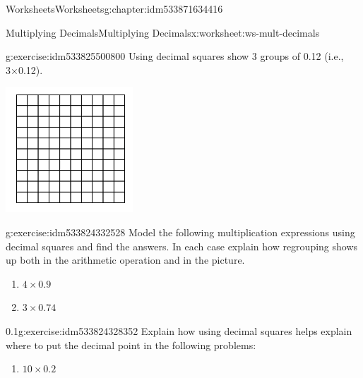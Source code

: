 \documentclass[twoside,11pt,]{book}
\begin{document}
\begin{chapterptx}{Worksheets}{}{Worksheets}{}{}{g:chapter:idm533871634416}
\begin{worksheet-section-numberless}{Multiplying Decimals}{}{Multiplying Decimals}{}{}{x:worksheet:ws-mult-decimals}
\begin{divisionexercise}{1}{}{}{g:exercise:idm533825500800}
Using decimal squares show 3 groups of 0.12 (i.e., 3×0.12).%
\begin{sidebyside}{1}{0.25}{0.25}{0}%
\begin{sbspanel}{0.5}%
\includegraphics[width=1\linewidth]{images/decimal-square.png}
\end{sbspanel}%
\end{sidebyside}%
\end{divisionexercise}%
\begin{divisionexercise}{2}{}{}{g:exercise:idm533824332528}%
Model the following multiplication expressions using decimal squares and find the answers. In each case explain how regrouping shows up both in the arithmetic operation and in the picture.%
%
\begin{enumerate}[label=(\alph*)]
\item{}\(4 \times 0.9 \)%
\item{}\(3 \times 0.74 \)%
\end{enumerate}
\end{divisionexercise}%
\begin{divisionexercise}{3}{}{0.1}{g:exercise:idm533824328352}%
Explain how using decimal squares helps explain where to put the decimal point in the following problems:%
%
\begin{enumerate}[label=(\alph*)]
\item{}\(10 \times 0.2 \)%

\end{enumerate}
\end{divisionexercise}
\end{worksheet-section-numberless}
\end{chapterptx}
\end{document}
